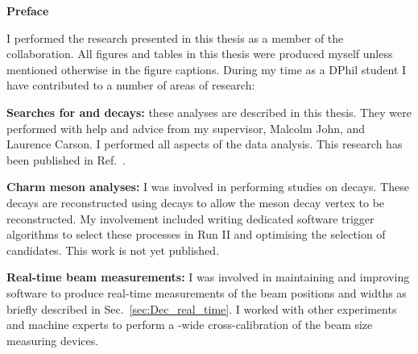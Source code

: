 \begin{alwayssingle} 
 \thispagestyle{empty}
 \begin{center}
   \vspace*{1.5cm}
   {\Large \bfseries  Preface}
 \end{center}
 \vspace{0.5cm}
 I performed the research presented in this thesis as a member of the \lhcb collaboration. All figures and tables in this thesis were produced myself unless mentioned otherwise in the figure captions.  
During my time as a DPhil student I have contributed to a number of areas of research: 
 \begin{description}
 \item \textbf{Searches for \decay{\Bp}{\Dsp\phiz} and \decay{\Bp}{\Dsp\Kp\Km} decays:} these analyses are described in this thesis. They were performed with help and advice from my supervisor, Malcolm John, and Laurence Carson. I performed all aspects of the data analysis. This research has been published in Ref.~\cite{LHCb-PAPER-2017-032}.

 \item \textbf{Charm meson analyses:} I was involved in performing studies on \decay{\Dp}{\pip\piz} decays. These decays are reconstructed using \decay{\piz}{\ep\en\Pgamma} decays to allow the \Dp meson decay vertex to be reconstructed. My involvement included writing dedicated software trigger algorithms to select these processes in Run II and optimising the selection of candidates. This work is not yet published. 

 \item \textbf{Real-time beam measurements:} I was involved in maintaining and improving software to produce real-time measurements of the \lhc beam positions and widths as briefly described in Sec.~\ref{sec:Dec_real_time}. I worked with other experiments and \lhc machine experts to perform a \lhc-wide cross-calibration of the beam size measuring devices.  


 \end{description}

\end{alwayssingle}



